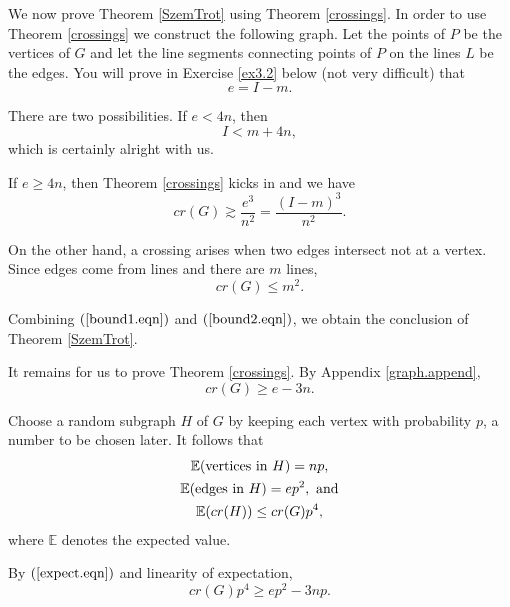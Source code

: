 \documentclass[]{stml-l}
\numberwithin{equation}{chapter}
\theoremstyle{plain}
\theoremstyle{definition}
\theoremstyle{remark}
\begin{document}
We now prove Theorem \ref{SzemTrot} using Theorem \ref{crossings}.
In order to use Theorem \ref{crossings} we construct the following
graph.  Let the points of $P$ be the vertices of $G$ and let the
line segments connecting points of $P$ on the lines $L$ be the
edges.  You will prove in Exercise \ref{ex3.2} below (not very
difficult) that
\begin{equation} \label{edges.eqn}
 e=I-m.
\end{equation}



There are two possibilities. If $e<4n$, then
\begin{equation} \label{bound1.eqn}
 I<m+4n,
\end{equation}
 which is certainly alright with us.

If $e \ge 4n$, then Theorem \ref{crossings} kicks in and we have
\begin{equation} \label{bound2.eqn}
cr(G) \gtrsim \frac{e^3}{n^2}=\frac{{(I-m)}^3}{n^2}.
\end{equation}



On the other hand, a crossing arises when two edges intersect not at
a vertex. Since edges come from lines and there are $m$ lines,
\begin{equation}
 cr(G) \leq m^2.
\end{equation}

Combining $(\ref{bound1.eqn})$ and $(\ref{bound2.eqn})$, we obtain
the conclusion of Theorem \ref{SzemTrot}.

It remains for us to prove Theorem \ref{crossings}. By Appendix \ref{graph.append},
\begin{equation}
 cr(G) \ge e-3n.
\end{equation}



Choose a random subgraph $H$ of $G$ by keeping each vertex with probability
$p$, a number to be chosen later. It follows that
\begin{gather}
\mathbb{E}(\text{vertices  in $H$})=np, \notag \\
\mathbb{E}(\text{edges  in $H$})=ep^2, \ \text{and} \notag \\
\mathbb{E}(cr(H)) \leq cr(G)p^4, \label{expect.eqn}
\end{gather}
where $\mathbb{E}$ denotes the expected value.

By $(\ref{expect.eqn})$ and linearity of expectation,
\begin{equation}
cr(G)p^4 \ge ep^2-3np.
\end{equation}
\end{document}
